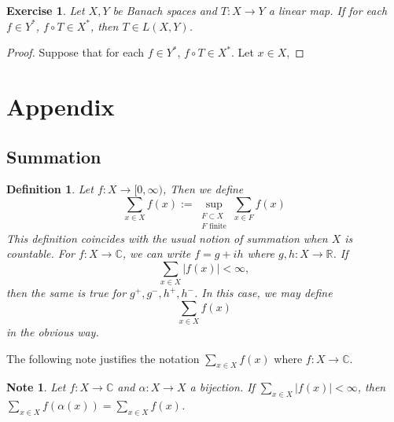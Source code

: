 \documentclass[12pt]{amsart}
\newtheorem{defn}[thm]{Definition}
\newtheorem{note}[thm]{Note}
\newtheorem{ex}[thm]{Exercise}
\newcommand{\al}{\alpha}
\newcommand{\C}{\mathbb{C}}
\newcommand{\R}{\mathbb{R}}
\newcommand{\Rg}{[0,\infty)}
\begin{document}
\begin{ex}
Let $X, Y$ be Banach spaces and $T:X \rightarrow Y$ a linear map. If for each $f \in Y^*$, $f \circ T \in X^*$, then $T \in L(X,Y)$. 
\end{ex}

\begin{proof}
Suppose that for each $f \in Y^*$, $f \circ T \in X^*$. Let $x \in X$, 
\end{proof}

















\newpage

\section{Appendix}

\subsection{Summation}

\begin{defn}
Let $f:X \rightarrow \Rg$, Then we define $$\sum_{x \in X} f(x) := \sup_{\substack{F \subset X \\ F \text{ finite}}} \sum_{x \in F} f(x)$$ This definition coincides with the usual notion of summation when $X$ is countable. For $f:X \rightarrow \C$, we can write $f = g +ih$ where $g,h:X \rightarrow \R$. If $$\sum_{x \in X}|f(x)| < \infty,$$ then the same is true for $g^+,g^-,h^+,h^-$. In this case, we may define $$\sum_{x \in X} f(x)$$ in the obvious way.
\end{defn} 

The following note justifies the notation $\sum_{x \in X}f(x)$ where $f:X \rightarrow \C$.

\begin{note}
Let $f:X \rightarrow \C$ and $\al:X \rightarrow X$ a bijection. If $\sum_{x \in X}|f(x)|< \infty$, then $\sum_{x \in X}f( \al (x)) = \sum_{x \in X}f(x) $.
\end{note}
\end{document}
